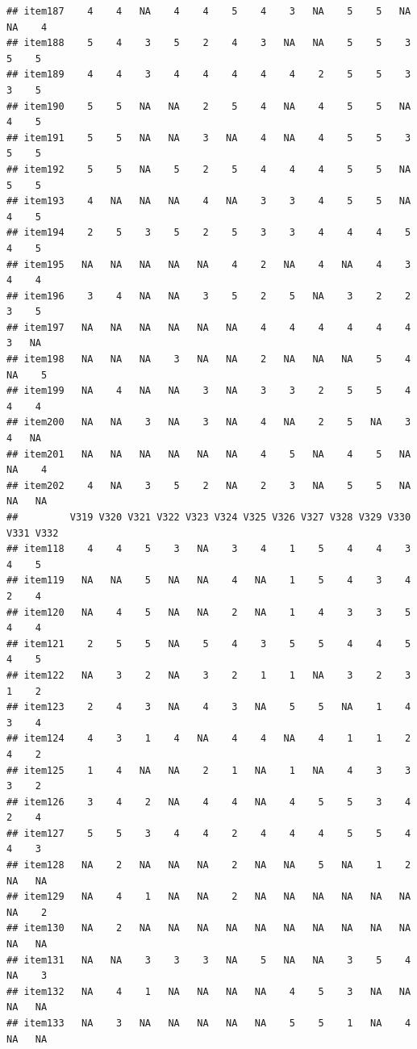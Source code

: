 \documentclass[
  man]{apa6}
\begin{document}
\begin{verbatim}
## item187    4    4   NA    4    4    5    4    3   NA    5    5   NA   NA    4
## item188    5    4    3    5    2    4    3   NA   NA    5    5    3    5    5
## item189    4    4    3    4    4    4    4    4    2    5    5    3    3    5
## item190    5    5   NA   NA    2    5    4   NA    4    5    5   NA    4    5
## item191    5    5   NA   NA    3   NA    4   NA    4    5    5    3    5    5
## item192    5    5   NA    5    2    5    4    4    4    5    5   NA    5    5
## item193    4   NA   NA   NA    4   NA    3    3    4    5    5   NA    4    5
## item194    2    5    3    5    2    5    3    3    4    4    4    5    4    5
## item195   NA   NA   NA   NA   NA    4    2   NA    4   NA    4    3    4    4
## item196    3    4   NA   NA    3    5    2    5   NA    3    2    2    3    5
## item197   NA   NA   NA   NA   NA   NA    4    4    4    4    4    4    3   NA
## item198   NA   NA   NA    3   NA   NA    2   NA   NA   NA    5    4   NA    5
## item199   NA    4   NA   NA    3   NA    3    3    2    5    5    4    4    4
## item200   NA   NA    3   NA    3   NA    4   NA    2    5   NA    3    4   NA
## item201   NA   NA   NA   NA   NA   NA    4    5   NA    4    5   NA   NA    4
## item202    4   NA    3    5    2   NA    2    3   NA    5    5   NA   NA   NA
##         V319 V320 V321 V322 V323 V324 V325 V326 V327 V328 V329 V330 V331 V332
## item118    4    4    5    3   NA    3    4    1    5    4    4    3    4    5
## item119   NA   NA    5   NA   NA    4   NA    1    5    4    3    4    2    4
## item120   NA    4    5   NA   NA    2   NA    1    4    3    3    5    4    4
## item121    2    5    5   NA    5    4    3    5    5    4    4    5    4    5
## item122   NA    3    2   NA    3    2    1    1   NA    3    2    3    1    2
## item123    2    4    3   NA    4    3   NA    5    5   NA    1    4    3    4
## item124    4    3    1    4   NA    4    4   NA    4    1    1    2    4    2
## item125    1    4   NA   NA    2    1   NA    1   NA    4    3    3    3    2
## item126    3    4    2   NA    4    4   NA    4    5    5    3    4    2    4
## item127    5    5    3    4    4    2    4    4    4    5    5    4    4    3
## item128   NA    2   NA   NA   NA    2   NA   NA    5   NA    1    2   NA   NA
## item129   NA    4    1   NA   NA    2   NA   NA   NA   NA   NA   NA   NA    2
## item130   NA    2   NA   NA   NA   NA   NA   NA   NA   NA   NA   NA   NA   NA
## item131   NA   NA    3    3    3   NA    5   NA   NA    3    5    4   NA    3
## item132   NA    4    1   NA   NA   NA   NA    4    5    3   NA   NA   NA   NA
## item133   NA    3   NA   NA   NA   NA   NA    5    5    1   NA    4   NA   NA

\end{verbatim}
\end{document}
